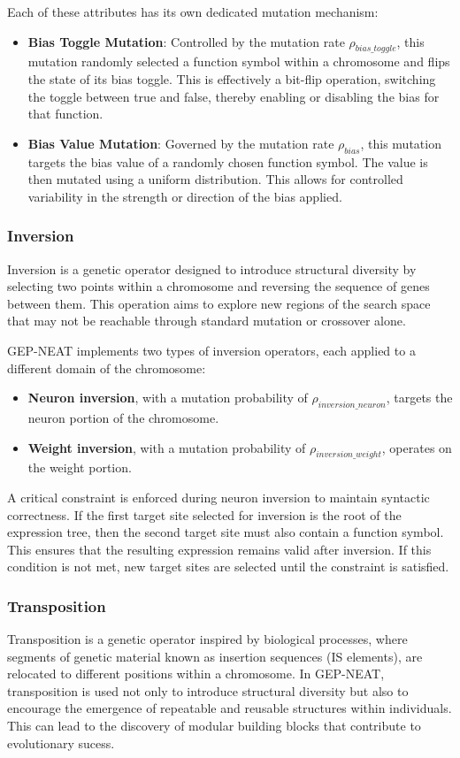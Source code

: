 \parbreak\noindent Each of these attributes has its own dedicated mutation mechanism:
\begin{itemize}
	\item \textbf{Bias Toggle Mutation}: Controlled by the mutation rate $\rho_{bias\_toggle}$, this mutation randomly selected a function symbol within a chromosome and flips the state of its bias toggle. This is effectively a bit-flip operation, switching the toggle between true and false, thereby enabling or disabling the bias for that function.
	\item \textbf{Bias Value Mutation}: Governed by the mutation rate $\rho_{bias}$, this mutation targets the bias value of a randomly chosen function symbol. The value is then mutated using a uniform distribution. This allows for controlled variability in the strength or direction of the bias applied.
\end{itemize}

\subsubsection{Inversion}
Inversion is a genetic operator designed to introduce structural diversity by selecting two points within a chromosome and reversing the sequence of genes between them. This operation aims to explore new regions of the search space that may not be reachable through standard mutation or crossover alone.

\parbreak\noindent GEP-NEAT implements two types of inversion operators, each applied to a different domain of the chromosome:
\begin{itemize}
	\item \textbf{Neuron inversion}, with a mutation probability of $\rho_{inversion\_neuron}$, targets the neuron portion of the chromosome.
	\item \textbf{Weight inversion}, with a mutation probability of $\rho_{inversion\_weight}$, operates on the weight portion.
\end{itemize}

\parbreak\noindent A critical constraint is enforced during neuron inversion to maintain syntactic correctness. If the first target site selected for inversion is the root of the expression tree, then the second target site must also contain a function symbol. This ensures that the resulting expression remains valid after inversion. If this condition is not met, new target sites are selected until the constraint is satisfied.

\subsubsection{Transposition}
Transposition is a genetic operator inspired by biological processes, where segments of genetic material known as insertion sequences (IS elements), are relocated to different positions within a chromosome. In GEP-NEAT, transposition is used not only to introduce structural diversity but also to encourage the emergence of repeatable and reusable structures within individuals. This can lead to the discovery of modular building blocks that contribute to evolutionary sucess.


